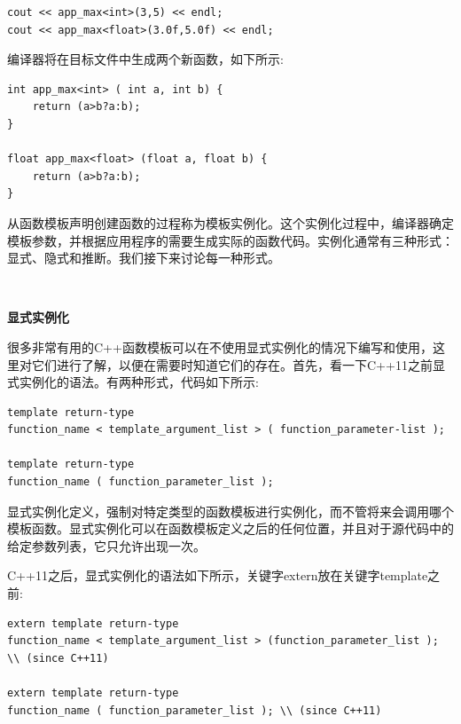 \begin{lstlisting}[caption={}]
cout << app_max<int>(3,5) << endl;
cout << app_max<float>(3.0f,5.0f) << endl;
\end{lstlisting}

编译器将在目标文件中生成两个新函数，如下所示:\par

\begin{lstlisting}[caption={}]
int app_max<int> ( int a, int b) {
	return (a>b?a:b);
}

float app_max<float> (float a, float b) {
	return (a>b?a:b);
}
\end{lstlisting}

从函数模板声明创建函数的过程称为模板实例化。这个实例化过程中，编译器确定模板参数，并根据应用程序的需要生成实际的函数代码。实例化通常有三种形式：显式、隐式和推断。我们接下来讨论每一种形式。 \par

\noindent\textbf{}\ \par
\textbf{显式实例化} \ \par
很多非常有用的C++函数模板可以在不使用显式实例化的情况下编写和使用，这里对它们进行了解，以便在需要时知道它们的存在。首先，看一下C++11之前显式实例化的语法。有两种形式，代码如下所示: \par

\begin{lstlisting}[caption={}]
template return-type
function_name < template_argument_list > ( function_parameter-list );

template return-type
function_name ( function_parameter_list );
\end{lstlisting}

显式实例化定义，强制对特定类型的函数模板进行实例化，而不管将来会调用哪个模板函数。显式实例化可以在函数模板定义之后的任何位置，并且对于源代码中的给定参数列表，它只允许出现一次。 \par
C++11之后，显式实例化的语法如下所示，关键字extern放在关键字template之前: \par

\begin{lstlisting}[caption={}]
extern template return-type
function_name < template_argument_list > (function_parameter_list ); \\ (since C++11)

extern template return-type
function_name ( function_parameter_list ); \\ (since C++11)
\end{lstlisting}

